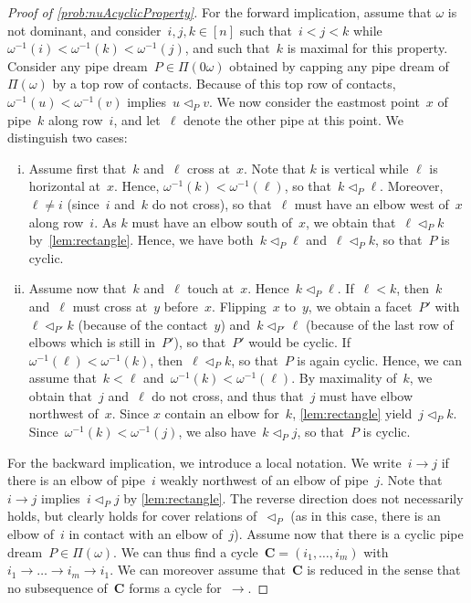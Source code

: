\documentclass[reqno]{amsart}
\theoremstyle{definition}
\renewcommand{\b}[1]{\boldsymbol{#1}} %
\newcommand{\pipeDreams}{\Pi} %
\newcommand{\less}{\vartriangleleft} %
\newcommand{\contactLess}[1]{\less_{#1}} %
\begin{document}
\begin{proof}[Proof of \cref{prob:nuAcyclicProperty}]
For the forward implication, assume that $\omega$ is not dominant, and consider~${i,j,k \in [n]}$ such that~$i < j < k$ while~$\omega^{-1}(i) < \omega^{-1}(k) < \omega^{-1}(j)$, and such that~$k$ is maximal for this property.
Consider any pipe dream~$P \in \pipeDreams(0\omega)$ obtained by capping any pipe dream of~$\pipeDreams(\omega)$ by a top row of contacts.
Because of this top row of contacts, $\omega^{-1}(u) < \omega^{-1}(v)$ implies~$u \contactLess{P} v$.
We now consider the eastmost point~$x$ of pipe~$k$ along row~$i$, and let~$\ell$ denote the other pipe at this point.
We distinguish two cases:
\begin{enumerate}[(i)]
\item Assume first that~$k$ and~$\ell$ cross at~$x$. Note that $k$ is vertical while $\ell$ is horizontal at~$x$. Hence, $\omega^{-1}(k) < \omega^{-1}(\ell)$,  so that~$k \contactLess{P} \ell$. Moreover, $\ell \ne i$ (since~$i$ and~$k$ do not cross), so that~$\ell$ must have an elbow west of~$x$ along row~$i$. As $k$ must have an elbow south of~$x$, we obtain that~$\ell \contactLess{P} k$ by~\cref{lem:rectangle}. Hence, we have both~$k \contactLess{P} \ell$ and~$\ell \contactLess{P} k$, so that~$P$ is cyclic.
\item Assume now that~$k$ and~$\ell$ touch at~$x$. Hence~$k \contactLess{P} \ell$. If~$\ell < k$, then~$k$ and~$\ell$ must cross at~$y$ before~$x$. Flipping~$x$ to~$y$, we obtain a facet~$P'$ with~$\ell \contactLess{P'} k$ (because of the contact~$y$) and~$k \contactLess{P'} \ell$ (because of the last row of elbows which is still in~$P'$), so that~$P'$ would be cyclic. If~$\omega^{-1}(\ell) < \omega^{-1}(k)$, then~$\ell \contactLess{P} k$, so that~$P$ is again cyclic. Hence, we can assume that~$k < \ell$ and~$\omega^{-1}(k) < \omega^{-1}(\ell)$. By maximality of~$k$, we obtain that~$j$ and~$\ell$ do not cross, and thus that~$j$ must have elbow northwest of~$x$. Since $x$ contain an elbow for~$k$, \cref{lem:rectangle} yield~$j \contactLess{P} k$. Since~$\omega^{-1}(k) < \omega^{-1}(j)$, we also have~$k \contactLess{P} j$, so that~$P$ is cyclic.
\end{enumerate}

For the backward implication, we introduce a local notation.
We write~$i \to j$ if there is an elbow of pipe~$i$ weakly northwest of an elbow of pipe~$j$.
Note that~$i \to j$ implies~$i \contactLess{P} j$ by \cref{lem:rectangle}.
The reverse direction does not necessarily holds, but clearly holds for cover relations of~$\contactLess{P}$ (as in this case, there is an elbow of~$i$ in contact with an elbow of~$j$).
Assume now that there is a cyclic pipe dream~$P \in \pipeDreams(\omega)$.
We can thus find a cycle~$\b{C}=(i_1, \dots, i_m)$ with~$i_1 \to \dots \to i_m \to i_1$.
We can moreover assume that~$\b{C}$ is reduced in the sense that no subsequence of~$\b{C}$ forms a cycle for~$\to$.


\end{proof}
\end{document}

